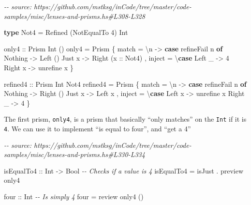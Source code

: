 \documentclass[]{article}
\newenvironment{Shaded}{}{}
\newcommand{\CommentTok}[1]{\textcolor[rgb]{0.38,0.63,0.69}{\textit{#1}}}
\newcommand{\DataTypeTok}[1]{\textcolor[rgb]{0.56,0.13,0.00}{#1}}
\newcommand{\DecValTok}[1]{\textcolor[rgb]{0.25,0.63,0.44}{#1}}
\newcommand{\KeywordTok}[1]{\textcolor[rgb]{0.00,0.44,0.13}{\textbf{#1}}}
\newcommand{\NormalTok}[1]{#1}
\newcommand{\OperatorTok}[1]{\textcolor[rgb]{0.40,0.40,0.40}{#1}}
\newcommand{\OtherTok}[1]{\textcolor[rgb]{0.00,0.44,0.13}{#1}}
\begin{document}
\begin{Shaded}
\begin{Highlighting}[]
\CommentTok{{-}{-} source: https://github.com/mstksg/inCode/tree/master/code{-}samples/misc/lenses{-}and{-}prisms.hs\#L308{-}L328}

\KeywordTok{type} \DataTypeTok{Not4} \OtherTok{=} \DataTypeTok{Refined}\NormalTok{ (}\DataTypeTok{NotEqualTo} \DecValTok{4}\NormalTok{) }\DataTypeTok{Int}

\OtherTok{only4 ::} \DataTypeTok{Prism\textquotesingle{}} \DataTypeTok{Int}\NormalTok{ ()}
\NormalTok{only4 }\OtherTok{=} \DataTypeTok{Prism\textquotesingle{}}
\NormalTok{    \{ match  }\OtherTok{=}\NormalTok{ \textbackslash{}n }\OtherTok{{-}>} \KeywordTok{case}\NormalTok{ refineFail n }\KeywordTok{of}
        \DataTypeTok{Nothing} \OtherTok{{-}>} \DataTypeTok{Left}\NormalTok{ ()}
        \DataTypeTok{Just}\NormalTok{ x  }\OtherTok{{-}>} \DataTypeTok{Right}\NormalTok{ (}\OtherTok{x ::} \DataTypeTok{Not4}\NormalTok{)}
\NormalTok{    , inject }\OtherTok{=}\NormalTok{ \textbackslash{}}\KeywordTok{case}
        \DataTypeTok{Left}\NormalTok{  \_ }\OtherTok{{-}>} \DecValTok{4}
        \DataTypeTok{Right}\NormalTok{ x }\OtherTok{{-}>}\NormalTok{ unrefine x}
\NormalTok{    \}}

\OtherTok{refined4 ::} \DataTypeTok{Prism\textquotesingle{}} \DataTypeTok{Int} \DataTypeTok{Not4}
\NormalTok{refined4 }\OtherTok{=} \DataTypeTok{Prism\textquotesingle{}}
\NormalTok{    \{ match  }\OtherTok{=}\NormalTok{ \textbackslash{}n }\OtherTok{{-}>} \KeywordTok{case}\NormalTok{ refineFail n }\KeywordTok{of}
        \DataTypeTok{Nothing} \OtherTok{{-}>} \DataTypeTok{Right}\NormalTok{ ()}
        \DataTypeTok{Just}\NormalTok{ x  }\OtherTok{{-}>} \DataTypeTok{Left}\NormalTok{ x}
\NormalTok{    , inject }\OtherTok{=}\NormalTok{ \textbackslash{}}\KeywordTok{case}
        \DataTypeTok{Left}\NormalTok{  x }\OtherTok{{-}>}\NormalTok{ unrefine x}
        \DataTypeTok{Right}\NormalTok{ \_ }\OtherTok{{-}>} \DecValTok{4}
\NormalTok{    \}}
\end{Highlighting}
\end{Shaded}

The first prism, \texttt{only4}, is a prism that basically ``only matches'' on
the \texttt{Int} if it is \texttt{4}. We can use it to implement ``is equal to
four'', and ``get a 4''

\begin{Shaded}
\begin{Highlighting}[]
\CommentTok{{-}{-} source: https://github.com/mstksg/inCode/tree/master/code{-}samples/misc/lenses{-}and{-}prisms.hs\#L330{-}L334}

\OtherTok{isEqualTo4 ::} \DataTypeTok{Int} \OtherTok{{-}>} \DataTypeTok{Bool}   \CommentTok{{-}{-} Checks if a value is 4}
\NormalTok{isEqualTo4 }\OtherTok{=}\NormalTok{ isJust }\OperatorTok{.}\NormalTok{ preview only4}

\OtherTok{four ::} \DataTypeTok{Int}     \CommentTok{{-}{-} Is simply \textasciigrave{}4\textasciigrave{}}
\NormalTok{four }\OtherTok{=}\NormalTok{ review only4 ()}
\end{Highlighting}
\end{Shaded}
\end{document}
